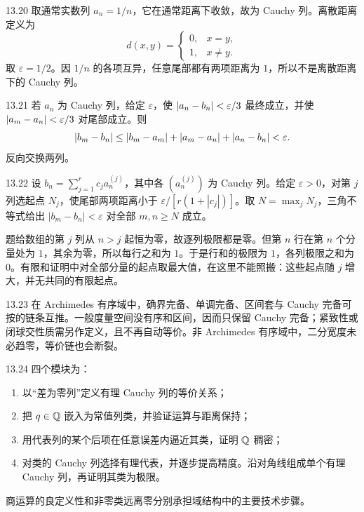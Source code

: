 \begin{solution}{13.20}
取通常实数列 \(a_n=1/n\)，它在通常距离下收敛，故为 Cauchy 列。离散距离定义为
\[
 d(x,y)=\begin{cases}0,&x=y,\\1,&x\ne y.\end{cases}
\]
取 \(\varepsilon=1/2\)。因 \(1/n\) 的各项互异，任意尾部都有两项距离为 \(1\)，所以不是离散距离下的 Cauchy 列。
\end{solution}

\begin{solution}{13.21}
若 \(a_n\) 为 Cauchy 列，给定 \(\varepsilon\)，使
\(\left|a_n-b_n\right|<\varepsilon/3\) 最终成立，并使
\(\left|a_m-a_n\right|<\varepsilon/3\) 对尾部成立。则
\[
 \left|b_m-b_n\right|
 \le\left|b_m-a_m\right|+\left|a_m-a_n\right|+\left|a_n-b_n\right|<\varepsilon.
\]
反向交换两列。
\end{solution}

\begin{solution}{13.22}
设 \(b_n=\sum_{j=1}^r c_j a_n^{(j)}\)，其中各 \((a_n^{(j)})\) 为 Cauchy 列。给定 \(\varepsilon>0\)，对第 \(j\) 列选起点 \(N_j\)，使尾部两项距离小于 \(\varepsilon/[r(1+|c_j|)]\)。取 \(N=\max_j N_j\)，三角不等式给出 \(|b_m-b_n|<\varepsilon\) 对全部 \(m,n\ge N\) 成立。

题给数组的第 \(j\) 列从 \(n>j\) 起恒为零，故逐列极限都是零。但第 \(n\) 行在第 \(n\) 个分量处为 \(1\)，其余为零，所以每行之和为 \(1\)。于是行和的极限为 \(1\)，各列极限之和为 \(0\)。有限和证明中对全部分量的起点取最大值，在这里不能照搬：这些起点随 \(j\) 增大，并无共同的有限起点。
\end{solution}

\begin{solution}{13.23}
在 Archimedes 有序域中，确界完备、单调完备、区间套与 Cauchy 完备可按的链条互推。一般度量空间没有序和区间，因而只保留 Cauchy 完备；紧致性或闭球交性质需另作定义，且不再自动等价。非 Archimedes 有序域中，二分宽度未必趋零，等价链也会断裂。
\end{solution}

\begin{solution}{13.24}
四个模块为：
\begin{enumerate}
 \item 以“差为零列”定义有理 Cauchy 列的等价关系；
 \item 把 \(q\in\mathbb{Q}\) 嵌入为常值列类，并验证运算与距离保持；
 \item 用代表列的某个后项在任意误差内逼近其类，证明 \(\mathbb{Q}\) 稠密；
 \item 对类的 Cauchy 列选择有理代表，并逐步提高精度。沿对角线组成单个有理 Cauchy 列，再证明其类为极限。
\end{enumerate}
商运算的良定义性和非零类远离零分别承担域结构中的主要技术步骤。
\end{solution}

